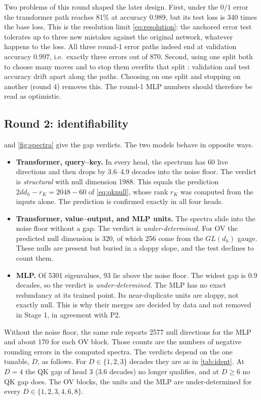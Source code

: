 \documentclass[11pt,a4paper]{article}
\theoremstyle{definition}
\begin{document}
Two problems of this round shaped the later design. First, under the $0/1$ error the
transformer path reaches 81\% at accuracy $0.989$, but its test loss is 340 times the
base loss. This is the resolution limit \eqref{eq:resolution}: the anchored error test
tolerates up to three new mistakes against the original network, whatever happens to the
loss. All three round-1 error paths indeed end at validation accuracy $0.997$, i.e.\
exactly three errors out of 870. Second, using one split both to choose many moves and to stop
them overfits that split \citep{cawley2010overfitting}: validation and test accuracy
drift apart along the paths. Choosing on one split and stopping on another
(round 4) removes this. The round-1 MLP numbers should therefore be read as optimistic.

\subsection{Round 2: identifiability}
\label{sec:res-ident}

 and \cref{fig:spectra} give the gap verdicts. The two models behave in
opposite ways.
\begin{itemize}
\item \textbf{Transformer, query--key.} In every head, the spectrum has 60 live
directions and then drops by 3.6--4.9 decades into the noise floor. The verdict is
\emph{structural} with null dimension 1988. This equals the prediction
$2dd_h-r_K=2048-60$ of \eqref{eq:qknull}, whose rank $r_K$ was computed from the inputs
alone. The prediction is confirmed exactly in all four heads.
\item \textbf{Transformer, value--output, and MLP units.} The spectra slide into the
noise floor without a gap. The verdict is \emph{under-determined}. For OV the predicted
null dimension is 320, of which 256 come from the $GL(d_h)$ gauge. These nulls are
present but buried in a sloppy slope, and the test declines to count them.
\item \textbf{MLP.} Of 5301 eigenvalues, 93 lie above the noise floor. The widest gap is
0.9 decades, so the verdict is \emph{under-determined}. The MLP has no exact redundancy at
its trained point. Its near-duplicate units are sloppy, not exactly null. This is why
their merges are decided by data and not removed in Stage 1, in agreement with P2.
\end{itemize}
Without the noise floor, the same rule reports 2577 null directions for the MLP and
about 170 for each OV block. Those counts are the numbers of negative rounding errors in
the computed spectra. The verdicts depend on the one tunable, $D$, as follows. For
$D\in\{1,2,3\}$ decades they are as in \cref{tab:ident}. At $D=4$ the QK gap of head 3
(3.6 decades) no longer qualifies, and at $D\ge6$ no QK gap does. The OV blocks, the
units and the MLP are under-determined for every $D\in\{1,2,3,4,6,8\}$.
\end{document}

